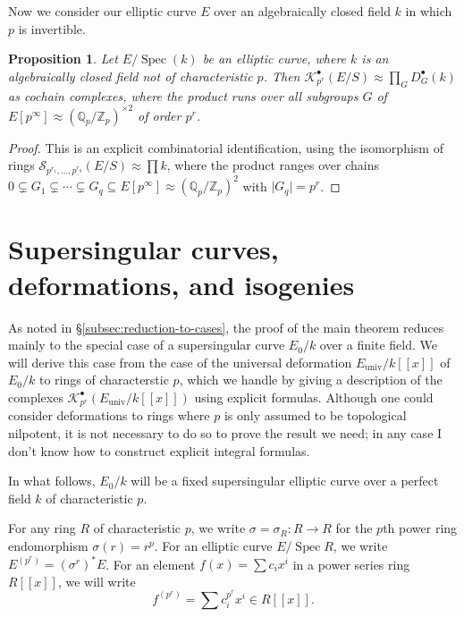 \documentclass[11pt]{amsart}
\numberwithin{equation}{section}
\theoremstyle{plain}
\newtheorem{prop}[subsection]{Proposition}
\theoremstyle{remark}
\theoremstyle{plain}
\begin{document}
Now we consider our elliptic curve $E$ over an algebraically closed field $k$
in which $p$ is invertible.  
\begin{prop}\label{prop:description-of-complex-when-p-inverted}
Let $E/{\operatorname{Spec}}(k)$ be an elliptic curve, where $k$ is an algebraically
closed field not of characteristic $p$.  Then
${\mathscr{K}}_{p^r}^\bullet(E/S)\approx \prod_G D^\bullet_{G}(k)$ as cochain
complexes, where the product runs over all subgroups $G$ of
$E[p^\infty]\approx ({\mathbb{Q}}_p/{\mathbb{Z}}_p)^{\times 2}$ of order $p^r$.
\end{prop}
\begin{proof}
This is an explicit combinatorial identification, using the
isomorphism of rings ${\mathscr{S}}_{p^{r_1},\dots,p^{r_q}}(E/S)\approx \prod
k$, where the product ranges over chains $0\subsetneq G_1\subsetneq
\cdots \subsetneq G_q\subseteq E[p^\infty]\approx ({\mathbb{Q}}_p/{\mathbb{Z}}_p)^2$ with
${\lvert{G_q}\rvert}=p^r$.  
\end{proof}

 
\section{Supersingular curves, deformations, and isogenies}
\label{sec:ss-formulas}

As noted in \S\ref{subsec:reduction-to-cases}, the proof of the main
theorem reduces mainly to the special case of a supersingular curve $E_0/k$ over
a finite field.  We
will derive this  case from the case of  the universal deformation
$E_{\mathrm{univ}}/k{[\![{x}]\!]}$ of
$E_0/k$ to rings of characterstic $p$, which we handle by giving a
description of the complexes
${\mathscr{K}}^\bullet_{p^r}(E_{\mathrm{univ}}/k{[\![{x}]\!]})$ using explicit
formulas.  Although one could  consider deformations to rings
where $p$ is only assumed to be topological nilpotent, it is not
necessary to do so 
to prove the result we need; in any case I don't know how to construct 
explicit integral formulas.

In what follows, $E_0/k$ will be a fixed supersingular elliptic curve over a
perfect field $k$ of characteristic $p$.  

For any ring $R$ of characteristic $p$, we
write $\sigma=\sigma_R\colon R{\rightarrow} R$ for the $p$th power ring
endomorphism $\sigma(r)=r^p$.  For an elliptic curve $E/{\operatorname{Spec}} R$, we
write $E^{(p^r)}=(\sigma^r)^*E$.  For an element $f(x)=\sum c_i x^i$
in a power series ring $R{[\![{x}]\!]}$, we will write
\[
f^{(p^r)} = \sum c_i^{p^r}x^i \in R{[\![{x}]\!]}.
\]
\end{document}
